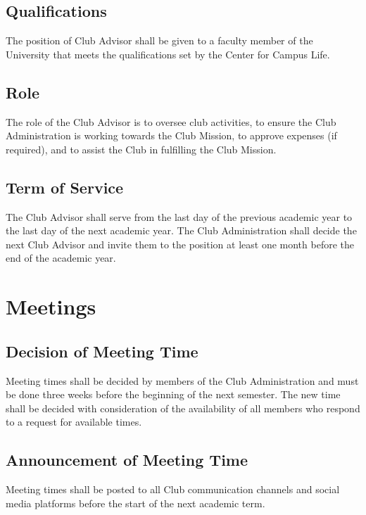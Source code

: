 \documentclass[english,11pt]{article}
\begin{document}
\subsection{Qualifications} \label{sect:advisor:qualifications}
The position of Club Advisor shall be given to a faculty member of the University that meets the qualifications set by the Center for Campus Life.

\subsection{Role} \label{sect:advisor:role}
The role of the Club Advisor is to oversee club activities, to ensure the Club Administration is working towards the Club Mission, to approve expenses (if required), and to assist the Club in fulfilling the Club Mission.

\subsection{Term of Service} \label{sect:advisor:term}
The Club Advisor shall serve from the last day of the previous academic year to the last day of the next academic year.
The Club Administration shall decide the next Club Advisor and invite them to the position at least one month before the end of the academic year.

\section{Meetings} \label{art:meetings}

\subsection{Decision of Meeting Time} \label{sect:meetings:decision}
Meeting times shall be decided by members of the Club Administration and must be done three weeks before the beginning of the next semester.
The new time shall be decided with consideration of the availability of all members who respond to a request for available times.

\subsection{Announcement of Meeting Time} \label{sect:meetings:announcement}
Meeting times shall be posted to all Club communication channels and social media platforms before the start of the next academic term.
\end{document}
